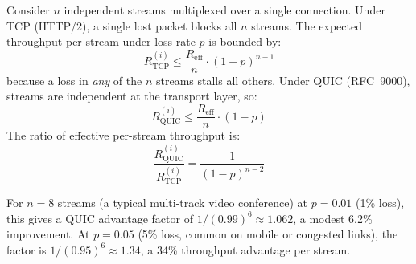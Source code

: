 Consider $n$ independent streams multiplexed over a single connection.
Under TCP (HTTP/2), a single lost packet blocks all $n$ streams. The
expected throughput per stream under loss rate $p$ is bounded by:
\begin{equation}
  R_{\text{TCP}}^{(i)} \leq \frac{R_{\text{eff}}}{n}
    \cdot (1 - p)^{n-1}
  \label{eq:hol-tcp}
\end{equation}
because a loss in \emph{any} of the $n$ streams stalls all others. Under
QUIC (RFC~9000), streams are independent at the transport layer, so:
\begin{equation}
  R_{\text{QUIC}}^{(i)} \leq \frac{R_{\text{eff}}}{n}
    \cdot (1 - p)
  \label{eq:hol-quic}
\end{equation}
The ratio of effective per-stream throughput is:
\begin{equation}
  \frac{R_{\text{QUIC}}^{(i)}}{R_{\text{TCP}}^{(i)}}
    = \frac{1}{(1-p)^{n-2}}
  \label{eq:hol-ratio}
\end{equation}

For $n = 8$ streams (a typical multi-track video conference) at
$p = 0.01$ (1\% loss), this gives a QUIC advantage factor of
$1/(0.99)^6 \approx 1.062$, a modest 6.2\% improvement. At $p = 0.05$
(5\% loss, common on mobile or congested links), the factor is
$1/(0.95)^6 \approx 1.34$, a 34\% throughput advantage per stream.

